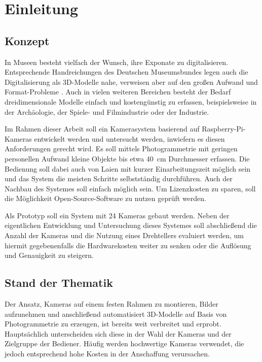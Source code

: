 \documentclass[./00PhotoBox.tex]{subfiles}
\begin{document}
\chapter{Einleitung}

\section{Konzept}

In Museen besteht vielfach der Wunsch, ihre Exponate zu digitalisieren. Entsprechende Handreichungen des Deutschen Museumsbundes legen auch die Digitalisierung als 3D-Modelle nahe, verweisen aber auf den großen Aufwand und Format-Probleme \citep[S. 43]{handreichung_digital}.
Auch in vielen weiteren Bereichen besteht der Bedarf dreidimensionale Modelle einfach und kostengünstig zu erfassen, beispielsweise in der Archäologie, der Spiele- und Filmindustrie oder der Industrie. 

Im Rahmen dieser Arbeit soll ein Kamerasystem basierend auf Raspberry-Pi-Kame\-ras entwickelt werden und untersucht werden, inwiefern es diesen Anforderungen gerecht wird. Es soll mittels Photogrammetrie mit geringen personellen Aufwand kleine Objekte bis etwa 40~cm Durchmesser erfassen. Die Bedienung soll dabei auch von Laien mit kurzer Einarbeitungszeit möglich sein und das System die meisten Schritte selbstständig durchführen. Auch der Nachbau des Systemes soll einfach möglich sein. Um Lizenzkosten zu sparen, soll die Möglichkeit Open-Source-Software zu nutzen geprüft werden.

Als Prototyp soll ein System mit 24 Kameras gebaut werden. Neben der eigentlichen Entwicklung und Untersuchung dieses Systemes soll abschließend die Anzahl der Kameras und die Nutzung eines Drehtellers evaluiert werden, um hiermit gegebenenfalls die Hardwarekosten weiter zu senken oder die Auflösung und Genauigkeit zu steigern.


\section{Stand der Thematik}
Der Ansatz, Kameras auf einem festen Rahmen zu montieren, Bilder aufzunehmen und anschließend automatisiert 3D-Modelle auf Basis von Photogrammetrie zu erzeugen, ist bereits weit verbreitet und erprobt. Hauptsächlich unterscheiden sich diese in der Wahl der Kameras und der Zielgruppe der Bediener. Häufig werden hochwertige Kameras verwendet, die jedoch entsprechend hohe Kosten in der Anschaffung verursachen.
\end{document}
